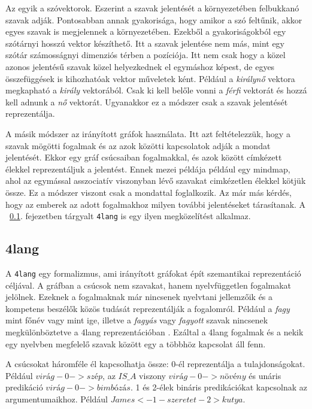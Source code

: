 Az egyik a szóvektorok. Eszerint a szavak jelentését a környezetében felbukkanó szavak adják.
Pontosabban annak gyakorisága, hogy amikor a szó feltűnik, akkor egyes szavak is megjelennek a környezetében. Ezekből a gyakoriságokból egy szótárnyi hosszú vektor készíthető.
Itt a szavak jelentése nem más, mint egy szótár számosságnyi dimenziós térben a pozíciója.
Itt nem csak hogy a közel azonos jelentésű szavak közel helyezkednek el egymáshoz képest, de egyes összefüggések is kihozhatóak vektor műveletek ként.
Például a \textit{királynő} vektora megkapható a \textit{király} vektorából.
Csak ki kell belőle vonni a \textit{férfi} vektorát és hozzá kell adnunk a \textit{nő} vektorát.
Ugyanakkor ez a módszer csak a szavak jelentését reprezentálja.
 
A másik módszer az irányított gráfok használata.
Itt azt feltételezzük, hogy a szavak mögötti fogalmak és az azok közötti kapcsolatok adják a mondat jelentését.
Ekkor egy gráf csúcsaiban fogalmakkal, és azok között címkézett élekkel reprezentáljuk a jelentést.
Ennek mezei példája például egy mindmap, ahol az egymással asszociatív viszonyban lévő szavakat cimkézetlen élekkel kötjük össze.
Ez a módszer viszont csak a mondattal foglalkozik.
Az már más kérdés, hogy az emberek az adott fogalmakhoz milyen további jelentéseket tárasítanak.
A ~\ref{sec:4lang}. fejezetben tárgyalt \texttt{4lang} is egy ilyen megközelítést alkalmaz.

\subsection{4lang}
\label{sec:4lang}
A \texttt{4lang}  \cite{Kornai:2015} egy formalizmus, ami irányított gráfokat épít szemantikai reprezentáció céljával. A gráfban a csúcsok nem szavakat, hanem nyelvfüggetlen fogalmakat jelölnek. Ezeknek a fogalmaknak már nincsenek nyelvtani jellemzőik és a kompetens beszélők közös tudását reprezentálják a fogalomról. Például a \textit{fagy} mint főnév vagy mint ige, illetve a \textit{fagyás} vagy \textit{fagyott} szavak nincsenek megkülönböztetve a 4lang reprezentációban \cite{Recski:2018}. Ezáltal a 4lang fogalmak és a nekik egy nyelvben megfelelő szavak között egy a többhöz kapcsolat áll fenn.

A csúcsokat háromféle él kapcsolhatja össze:
0-él reprezentálja a tulajdonságokat. Például \textit{$virág -0-> szép$}, az \textit{$IS\_A$} viszony \textit{$virág -0->  növény$} és unáris predikáció \textit{$virág -0-> bimbózás$}.
1 és 2-élek bináris predikációkat kapcsolnak az argumentumaikhoz. Például \textit{$James <-1- szeretet -2> kutya$}.

